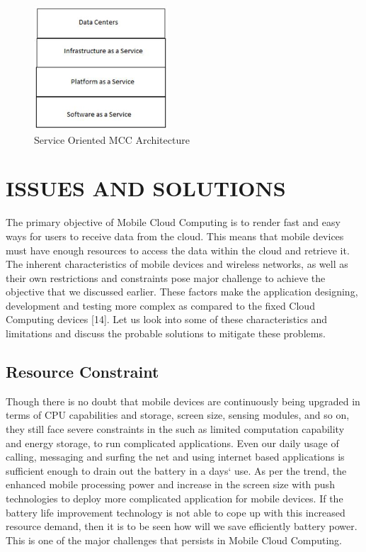 \documentclass[10pt, conference, compsocconf]{IEEEtran}
\begin{document}
\begin{figure}[h!]
\begin{center}
    \includegraphics[scale=1,width=50mm]{fig3v2}
\end{center}
\caption{Service Oriented MCC Architecture}
\end{figure}



\section{ISSUES AND SOLUTIONS}
The primary objective of Mobile Cloud Computing is to render fast and easy ways for users to receive data from the cloud. This means that mobile devices must have enough resources to access the data within the cloud and retrieve it. The inherent characteristics of mobile devices and wireless networks, as well as their own restrictions and constraints pose major challenge to achieve the objective that we discussed earlier. These factors make the application designing, development and testing more complex as compared to the fixed Cloud Computing devices [14]. Let us look into some of these characteristics and limitations and discuss the probable solutions to mitigate these problems.


\subsection{Resource Constraint}
Though there is no doubt that mobile devices are continuously being upgraded in terms of CPU capabilities and storage, screen size, sensing modules, and so on, they still face severe constraints in the such as limited computation capability and energy storage, to run complicated applications. Even our daily usage of calling, messaging and surfing the net and using internet based applications is sufficient enough to drain out the battery in a days` use. As per the trend, the enhanced mobile processing power and increase in the screen size with push technologies to deploy more complicated application for mobile devices. If the battery life improvement technology is not able to cope up with this increased resource demand, then it is to be seen how will we save efficiently battery power. This is one of the major challenges that persists in  Mobile Cloud Computing.
\end{document}
